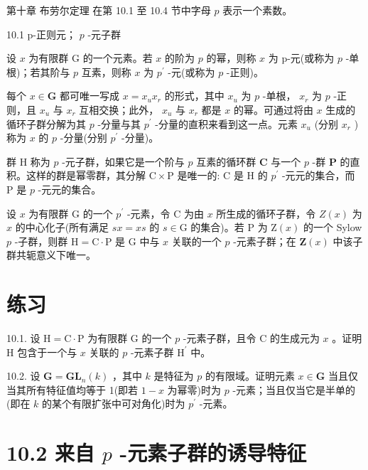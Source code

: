 \documentclass[10pt]{article}
\begin{document}
第十章 布劳尔定理 在第 10.1 至 10.4 节中字母 \(p\) 表示一个素数。

10.1 p-正则元； \(p\) -元子群

设 \(x\) 为有限群 G 的一个元素。若 \(x\) 的阶为 \(p\) 的幂，则称 \(x\) 为 p-元(或称为 \(p\) -单根)；若其阶与 \(p\) 互素，则称 \(x\) 为 \({p}^{\prime }\) -元(或称为 \(p\) -正则)。

每个 \(x \in  \mathbf{G}\) 都可唯一写成 \(x = {x}_{u}{x}_{r}\) 的形式，其中 \({x}_{u}\) 为 \(p\) -单根， \({x}_{r}\) 为 \(p\) -正则，且 \({x}_{u}\) 与 \({x}_{r}\) 互相交换；此外， \({x}_{u}\) 与 \({x}_{r}\) 都是 \(x\) 的幂。可通过将由 \(x\) 生成的循环子群分解为其 \(p\) -分量与其 \({p}^{\prime }\) -分量的直积来看到这一点。元素 \({x}_{u}\) (分别 \({x}_{r}\) )称为 \(x\) 的 \(p\) -分量(分别 \({p}^{\prime }\) -分量)。

群 \(\mathrm{H}\) 称为 \(p\) -元子群，如果它是一个阶与 \(p\) 互素的循环群 \(\mathbf{C}\) 与一个 \(p\) -群 \(\mathbf{P}\) 的直积。这样的群是幂零群，其分解 \(\mathrm{C} \times  \mathrm{P}\) 是唯一的: \(\mathrm{C}\) 是 \(\mathrm{H}\) 的 \({p}^{\prime }\) -元元的集合，而 \(\mathrm{P}\) 是 \(p\) -元元的集合。

设 \(x\) 为有限群 \(\mathrm{G}\) 的一个 \({p}^{\prime }\) -元素，令 \(\mathrm{C}\) 为由 \(x\) 所生成的循环子群，令 \(Z\left( x\right)\) 为 \(x\) 的中心化子(所有满足 \({sx} = {xs}\) 的 \(s \in  \mathrm{G}\) 的集合)。若 \(\mathrm{P}\) 为 \(\mathrm{Z}\left( x\right)\) 的一个 Sylow \(p\) -子群，则群 \(\mathrm{H} = \mathrm{C} \cdot  \mathrm{P}\) 是 \(\mathrm{G}\) 中与 \(x\) 关联的一个 \(p\) -元素子群；在 \(\mathbf{Z}\left( x\right)\) 中该子群共轭意义下唯一。

\section*{练习}

10.1. 设 \(\mathrm{H} = \mathrm{C} \cdot  \mathrm{P}\) 为有限群 \(\mathrm{G}\) 的一个 \(p\) -元素子群，且令 C 的生成元为 \(x\) 。证明 \(\mathrm{H}\) 包含于一个与 \(x\) 关联的 \(p\) -元素子群 \({\mathrm{H}}^{\prime }\) 中。

10.2. 设 \(\mathbf{G} = {\mathbf{{GL}}}_{n}\left( k\right)\) ，其中 \(k\) 是特征为 \(p\) 的有限域。证明元素 \(x \in  \mathbf{G}\) 当且仅当其所有特征值均等于 1(即若 \(1 - x\) 为幂零)时为 \(p\) -元素；当且仅当它是半单的(即在 \(k\) 的某个有限扩张中可对角化)时为 \({p}^{\prime }\) -元素。

\section*{10.2 来自 \(p\) -元素子群的诱导特征}
\end{document}
